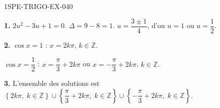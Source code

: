 \begin{corrige}{1SPE-TRIGO-EX-040}

\textbf{1.} $2u^2 - 3u + 1 = 0$. $\Delta = 9 - 8 = 1$. $u = \dfrac{3 \pm 1}{4}$, d'ou $u = 1$ ou $u = \dfrac{1}{2}$.

\textbf{2.} $\cos x = 1$ : $x = 2k\pi$, $k \in \mathbb{Z}$.

$\cos x = \dfrac{1}{2}$ : $x = \dfrac{\pi}{3} + 2k\pi$ ou $x = -\dfrac{\pi}{3} + 2k\pi$, $k \in \mathbb{Z}$.

\textbf{3.} L'ensemble des solutions est $\left\{2k\pi,\; k \in \mathbb{Z}\right\} \cup \left\{\dfrac{\pi}{3} + 2k\pi,\; k \in \mathbb{Z}\right\} \cup \left\{-\dfrac{\pi}{3} + 2k\pi,\; k \in \mathbb{Z}\right\}$.

\end{corrige}

